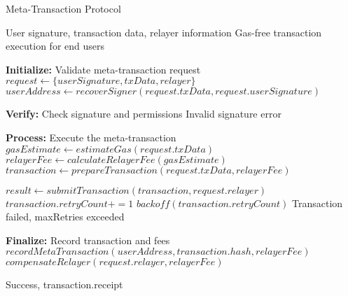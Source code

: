 
\begin{algorithm}
\caption{Meta-Transaction Protocol}
\label{alg:meta-tx}
\begin{algorithmic}[1]
\Require User signature, transaction data, relayer information
\Ensure Gas-free transaction execution for end users

\State \textbf{Initialize:} Validate meta-transaction request
\State $request \gets \{userSignature, txData, relayer\}$
\State $userAddress \gets recoverSigner(request.txData, request.userSignature)$

\State \textbf{Verify:} Check signature and permissions
    \State \Return Invalid signature error
\EndIf

\State \textbf{Process:} Execute the meta-transaction
\State $gasEstimate \gets estimateGas(request.txData)$
\State $relayerFee \gets calculateRelayerFee(gasEstimate)$
\State $transaction \gets prepareTransaction(request.txData, relayerFee)$

    \State $result \gets submitTransaction(transaction, request.relayer)$
            \State $transaction.retryCount += 1$
            \State $backoff(transaction.retryCount)$
        \Else
            \State \Return Transaction failed, maxRetries exceeded
        \EndIf
    \EndIf
\EndWhile

\State \textbf{Finalize:} Record transaction and fees
\State $recordMetaTransaction(userAddress, transaction.hash, relayerFee)$
\State $compensateRelayer(request.relayer, relayerFee)$

\State \Return Success, transaction.receipt
\end{algorithmic}
\end{algorithm} 